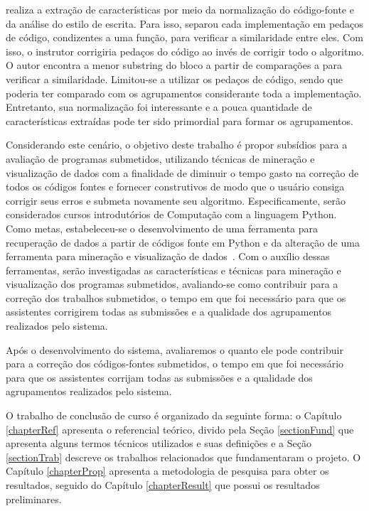 	 realiza a extração de características por meio da normalização
	do código-fonte e da análise do estilo de escrita. Para isso, separou cada implementação
	em pedaços de código, condizentes a uma função, para verificar a similaridade entre eles.
	Com isso, o instrutor corrigiria pedaços do código ao invés de corrigir todo o algoritmo.
	O autor encontra a menor substring do bloco a partir de comparações  a
	 para verificar a similaridade. Limitou-se a utilizar os pedaços de
	código, sendo que poderia ter comparado com os agrupamentos considerante toda a
	implementação. Entretanto, sua normalização foi interessante e a pouca quantidade de
	características extraídas pode ter sido primordial para formar os agrupamentos.
	
	
	Considerando este cenário, o objetivo deste trabalho é propor subsídios para a
	avaliação de programas submetidos, utilizando técnicas de mineração e visualização
	de dados com a finalidade de diminuir o tempo gasto na correção de todos os códigos
	fontes e  fornecer  construtivos de modo que o usuário consiga
	corrigir seus erros e submeta novamente seu algoritmo. Especificamente, serão
	considerados cursos introdutórios de Computação com a linguagem Python. Como
	metas, estabeleceu-se o desenvolvimento de uma ferramenta para recuperação de
	dados a partir de códigos fonte em Python e da alteração de uma ferramenta para
	mineração e visualização de dados~\cite{Alencar}. Com o auxílio dessas ferramentas,
	serão investigadas as características e técnicas para mineração e visualização
	dos programas submetidos, avaliando-se como contribuir para
	a correção dos trabalhos submetidos, o tempo em que foi necessário para
	que os assistentes corrigirem todas as submissões e a qualidade dos agrupamentos
	realizados pelo sistema.
	
	Após o desenvolvimento do sistema, avaliaremos o quanto ele pode contribuir para
	a correção dos códigos-fontes submetidos, o tempo em que foi necessário para que
	os assistentes corrijam todas as submissões e a qualidade dos agrupamentos
	realizados pelo sistema.
	
	O trabalho de conclusão de curso é organizado da seguinte forma: o Capítulo
	\ref{chapterRef} apresenta o referencial teórico, divido pela Seção \ref{sectionFund}
	que apresenta alguns termos técnicos utilizados e suas definições e a Seção
	\ref{sectionTrab} descreve os trabalhos relacionados que fundamentaram o projeto.
	O Capítulo \ref{chapterProp} apresenta a metodologia de pesquisa para obter os
	resultados, seguido do Capítulo \ref{chapterResult} que possui os resultados
	preliminares.